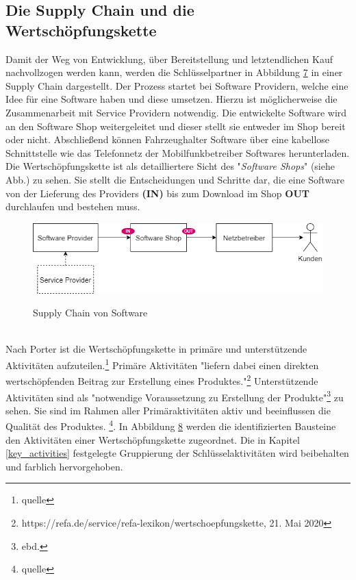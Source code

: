 \subsection{Die Supply Chain und die Wertschöpfungskette}\label{wsk}
Damit der Weg von Entwicklung, über Bereitstellung und letztendlichen Kauf nachvollzogen werden kann, werden die Schlüsselpartner in Abbildung \hyperref[img:supplychain]{7} in einer Supply Chain dargestellt. Der Prozess startet bei Software Providern, welche eine Idee für eine Software haben und diese umsetzen. Hierzu ist möglicherweise die Zusammenarbeit mit Service Providern notwendig. Die entwickelte Software wird an den Software Shop weitergeleitet und dieser stellt sie entweder im Shop bereit oder nicht. Abschließend können Fahrzeughalter Software über eine kabellose Schnittstelle wie das Telefonnetz der Mobilfunkbetreiber Softwares herunterladen. Die Wertschöpfungskette ist als detailliertere Sicht des "\textit{Software Shops}" (siehe Abb.) zu sehen. Sie stellt die Entscheidungen und Schritte dar, die eine Software von der Lieferung des Providers \textbf{(IN)} bis zum Download im Shop \textbf{OUT} durchlaufen und bestehen muss.
\begin{figure}[!h]
	\centering
	\includegraphics[width=0.9\columnwidth]{pictures/konzept-supplychain.png}
	\label{img:supplychain}
	\caption{Supply Chain von Software}
\end{figure}\\
Nach Porter ist die Wertschöpfungskette in primäre und unterstützende Aktivitäten aufzuteilen.\footnote{quelle} Primäre Aktivitäten "liefern dabei einen direkten wertschöpfenden Beitrag zur Erstellung eines Produktes."\footnote{https://refa.de/service/refa-lexikon/wertschoepfungskette, 21. Mai 2020} Unterstützende Aktivitäten sind als "notwendige Voraussetzung zu Erstellung der Produkte"\footnote{ebd.} zu sehen. Sie sind im Rahmen aller Primäraktivitäten aktiv und beeinflussen die Qualität des Produktes. \footnote{quelle}. In Abbildung \hyperref[img:wsk]{8} werden die identifizierten Bausteine den Aktivitäten einer Wertschöpfungskette zugeordnet. Die in Kapitel \ref{key_activities} festgelegte Gruppierung der Schlüsselaktivitäten wird beibehalten und farblich hervorgehoben.


